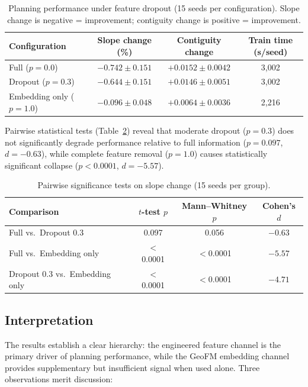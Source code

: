 \documentclass{article}
\begin{document}
\begin{table}[htbp]
\centering
\caption{Planning performance under feature dropout (15 seeds per configuration). Slope change is negative = improvement; contiguity change is positive = improvement.}
\label{tab:dropout}
\begin{tabular}{lccc}
\toprule
Configuration & Slope change (\%) & Contiguity change & Train time (s/seed) \\
\midrule
Full ($p=0.0$) & $-0.742 \pm 0.151$ & $+0.0152 \pm 0.0042$ & 3{,}002 \\
Dropout ($p=0.3$) & $-0.644 \pm 0.151$ & $+0.0146 \pm 0.0051$ & 3{,}002 \\
Embedding only ($p=1.0$) & $-0.096 \pm 0.048$ & $+0.0064 \pm 0.0036$ & 2{,}216 \\
\bottomrule
\end{tabular}
\end{table}

Pairwise statistical tests (Table~\ref{tab:significance}) reveal that moderate dropout ($p=0.3$) does not significantly degrade performance relative to full information ($p = 0.097$, $d = -0.63$), while complete feature removal ($p=1.0$) causes statistically significant collapse ($p < 0.0001$, $d = -5.57$).

\begin{table}[htbp]
\centering
\caption{Pairwise significance tests on slope change (15 seeds per group).}
\label{tab:significance}
\begin{tabular}{lccc}
\toprule
Comparison & $t$-test $p$ & Mann--Whitney $p$ & Cohen's $d$ \\
\midrule
Full vs.\ Dropout 0.3 & 0.097 & 0.056 & $-0.63$ \\
Full vs.\ Embedding only & $<$0.0001 & $<$0.0001 & $-5.57$ \\
Dropout 0.3 vs.\ Embedding only & $<$0.0001 & $<$0.0001 & $-4.71$ \\
\bottomrule
\end{tabular}
\end{table}

\subsection{Interpretation}

The results establish a clear hierarchy: the engineered feature channel is the primary driver of planning performance, while the GeoFM embedding channel provides supplementary but insufficient signal when used alone. Three observations merit discussion:
\end{document}
